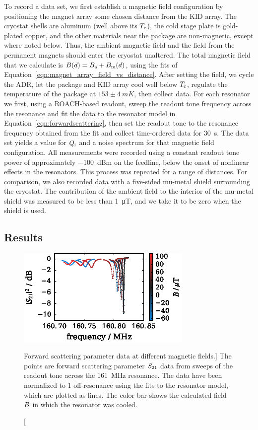 To record a data set, we first establish a magnetic field configuration by positioning the magnet array some chosen distance from the KID array.
The cryostat shells are aluminum (well above its $T_{\mathrm{c}}$), the cold stage plate is gold-plated copper, and the other materials near the package are non-magnetic, except where noted below.
Thus, the ambient magnetic field and the field from the permanent magnets should enter the cryostat unaltered.
The total magnetic field that we calculate is
$B(d) = B_{\mathrm{a}} + B_{\mathrm{m}}(d)$,
using the fits of Equation~\ref{eqn:magnet_array_field_vs_distance}.
After setting the field, we cycle the ADR, let the package and KID array cool well below $T_{\mathrm{c}}$, regulate the temperature of the package at $153 \pm \SI{4}{mK}$, then collect data.
For each resonator we first, using a ROACH-based readout, sweep the readout tone frequency across the resonance and fit the data to the resonator model in Equation~\ref{eqn:forwardscattering}, then set the readout tone to the resonance frequency obtained from the fit and collect time-ordered data for \SI{30}{s}.
The data set yields a value for $Q_{\mathrm{i}}$ and a noise spectrum for that magnetic field configuration.
All measurements were recorded using a constant readout tone power of approximately \SI{-100}{dBm} on the feedline, below the onset of nonlinear effects in the resonators.
This process was repeated for a range of distances.
For comparison, we also recorded data with a five-sided mu-metal shield surrounding the cryostat.
The contribution of the ambient field to the interior of the mu-metal shield was measured to be less than \SI{1}{\micro T}, and we take it to be zero when the shield is used.

\subsection{Results}

\begin{figure}[tbp]
\centering
\includegraphics[width=0.75\textwidth]{loss/s21_vs_f_colorbar_B.eps}
\caption
[Forward scattering parameter data at different magnetic fields.]
{The points are forward scattering parameter $S_{21}$ data from sweeps of the readout tone across the \SI{161}{MHz} resonance.
The data have been normalized to 1 off-resonance using the fits to the resonator model, which are plotted as lines.
The color bar shows the calculated field $B$ in which the resonator was cooled.}
\label{fig:loss.s21_vs_f}
\end{figure}

